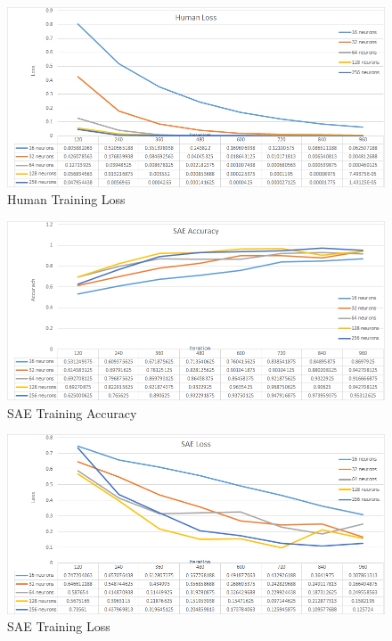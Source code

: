 \documentclass[draft,dvipsnames]{drexel-thesis}
\begin{document}
\begin{thesis}
\begin{figure}[t!]
    \centering
    \includegraphics[width=\textwidth]{pictures/result_pictures/Human_Loss.png}
    \caption{Human Training Loss}
    \label{fig:human_loss}
\end{figure}

\begin{figure}[t!]
    \centering
    \includegraphics[width=\textwidth]{pictures/result_pictures/SAE_Accuracy.png}
    \caption{SAE Training Accuracy}
    \label{fig:sae_accuracy}
\end{figure}

\begin{figure}[t!]
    \centering
    \includegraphics[width=\textwidth]{pictures/result_pictures/SAE_Loss.png}
    \caption{SAE Training Loss}
    \label{fig:sae_loss}
\end{figure}


\end{thesis}
\end{document}
